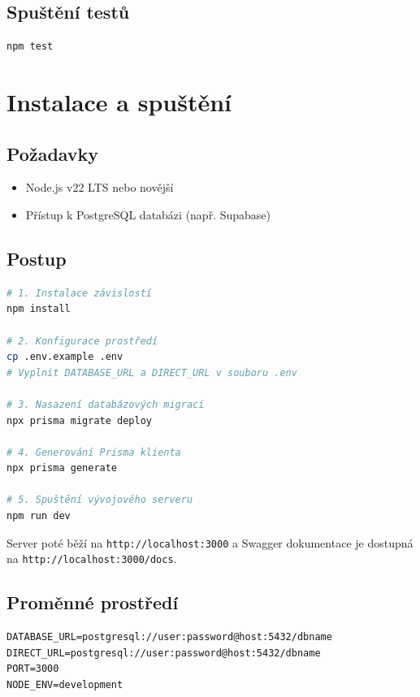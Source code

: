 \documentclass[12pt,a4paper]{article}
\begin{document}
\subsection{Spuštění testů}

\begin{lstlisting}[language=bash]
npm test
\end{lstlisting}

\section{Instalace a spuštění}

\subsection{Požadavky}

\begin{itemize}
  \item Node.js v22 LTS nebo novější
  \item Přístup k PostgreSQL databázi (např. Supabase)
\end{itemize}

\subsection{Postup}

\begin{lstlisting}[language=bash]
# 1. Instalace závislostí
npm install

# 2. Konfigurace prostředí
cp .env.example .env
# Vyplnit DATABASE_URL a DIRECT_URL v souboru .env

# 3. Nasazení databázových migrací
npx prisma migrate deploy

# 4. Generování Prisma klienta
npx prisma generate

# 5. Spuštění vývojového serveru
npm run dev
\end{lstlisting}

Server poté běží na \texttt{http://localhost:3000} a Swagger dokumentace je dostupná na \texttt{http://localhost:3000/docs}.

\subsection{Proměnné prostředí}

\begin{lstlisting}[caption={.env.example}]
DATABASE_URL=postgresql://user:password@host:5432/dbname
DIRECT_URL=postgresql://user:password@host:5432/dbname
PORT=3000
NODE_ENV=development
\end{lstlisting}
\end{document}
